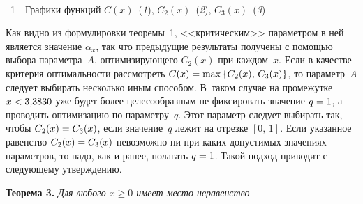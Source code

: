 \begin{multicols}{2}

\begin{center} %
\vspace*{2pt}
\mbox{%
 \epsfxsize=63.453mm
}
\end{center}
\begin{center}
\vspace*{6pt}
{{\figurename~1}\ \ \small{Графики функций $C(x)$~(\textit{1}), 
$C_2(x)$~(\textit{2}), $C_3(x)$~(\textit{3})}}
\end{center}
\vspace*{6pt}

\addtocounter{figure}{1}


Как видно из формулировки теоремы~1, <<критическим>> параметром в
ней является значение $\alpha_x$, так что предыдущие результаты
получены с по\-мощью выбора параметра~$A$, оптимизирующего $C_2(x)$
при каждом~$x$. Если в качестве критерия оптимальности рассмотреть
$C(x)\hm=\max\left\{C_2(x),\, C_3(x)\right\}$, то параметр~$A$ следует
выбирать несколько иным способом. В~таком случае на промежутке
$x\hm<3{,}3830$ уже будет более целесообразным не фиксировать значение
$q\hm=1$, а проводить оптимизацию по параметру~$q$. Этот параметр
следует выбирать так, чтобы $C_2(x)\hm=C_3(x)$, если значение~$q$
лежит на отрезке $[0,\,1]$. Если указанное равенство $C_2(x)\hm=C_3(x)$
невозможно ни при каких допустимых значениях параметров, то надо,
как и ранее, полагать $q\hm=1$. Такой подход приводит с следующему
утверждению.

\smallskip

\noindent
\textbf{Теорема 3.} \textit{Для любого $x\geqslant 0$ имеет место неравенство}

\end{multicols}

